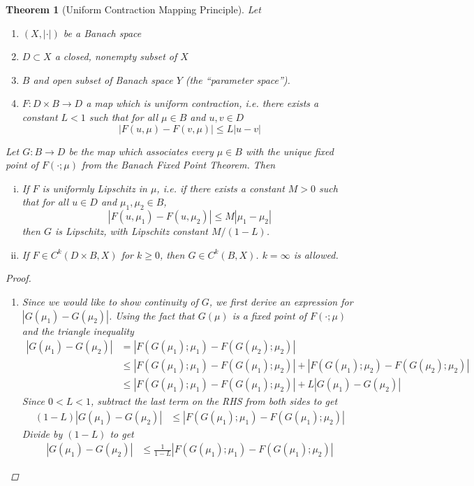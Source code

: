 \documentclass[10pt]{article}         %
\newtheorem{theorem}{Theorem}[section]
\theoremstyle{remark}
\begin{document}
\begin{theorem}[Uniform Contraction Mapping Principle]
Let 
\begin{enumerate}
\item $(X, |\cdot|)$ be a Banach space
\item $D \subset X$ a closed, nonempty subset of $X$
\item $B$ and open subset of Banach space $Y$ (the ``parameter space'').
\item $F: D \times B \rightarrow D$ a map which is \emph{uniform contraction}, i.e. there exists a constant $L < 1$ such that for all $\mu \in B$ and $u, v \in D$
\begin{equation}
|F(u, \mu) - F(v, \mu)| \leq L|u - v|
\end{equation}
\end{enumerate}

Let $G: B \rightarrow D$ be the map which associates every $\mu \in B$ with the unique fixed point of $F(\cdot; \mu)$ from the Banach Fixed Point Theorem. Then

\begin{enumerate}[(i)]
\item If $F$ is uniformly Lipschitz in $\mu$, i.e. if there exists a constant $M > 0$ such that for all $u \in D$ and $\mu_1, \mu_2 \in B$, 
\[
|F(u, \mu_1) - F(u, \mu_2)| \leq M |\mu_1 - \mu_2|
\]
then $G$ is Lipschitz, with Lipschitz constant $M / (1 - L)$.
\item If $F \in C^k(D \times B, X)$ for $k \geq 0$, then $G \in C^k(B, X)$. $k = \infty$ is allowed.
\end{enumerate}
\begin{proof}

\begin{enumerate}
Define $G(\mu)$ as in the statement of the theorem. By the Banach Fixed Point Theorem, $G: D \rightarrow B$ is the unique function so that $F(x; \mu) = x$ if and only if $x = G(\mu)$. We proceed in the following steps.

\item Since we would like to show continuity of $G$, we first derive an expression for $|G(\mu_1) - G(\mu_2)|$. Using the fact that $G(\mu)$ is a fixed point of $F(\cdot; \mu)$ and the triangle inequality
\begin{align*}
|G(\mu_1) - G(\mu_2)| &= |F( G(\mu_1); \mu_1) - F(G(\mu_2); \mu_2)| \\
&\leq |F( G(\mu_1); \mu_1) - F(G(\mu_1); \mu_2)| + |F( G(\mu_1); \mu_2) - F(G(\mu_2); \mu_2)| \\
&\leq |F( G(\mu_1); \mu_1) - F(G(\mu_1); \mu_2)| + L |G(\mu_1) - G(\mu_2)|
\end{align*}
Since $0 < L < 1$, subtract the last term on the RHS from both sides to get
\begin{align*}
(1 - L)|G(\mu_1) - G(\mu_2)| 
&\leq |F( G(\mu_1); \mu_1) - F(G(\mu_1); \mu_2)|
\end{align*}
Divide by $(1 - L)$ to get 
\begin{align}\label{Gmudiff}
|G(\mu_1) - G(\mu_2)| &\leq \frac{1}{1-L}|F( G(\mu_1); \mu_1) - F(G(\mu_1); \mu_2)|
\end{align}


\end{enumerate}
\end{proof}
\end{theorem}
\end{document}
